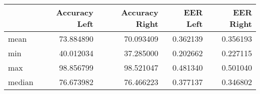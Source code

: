 \begin{tabular}{lrrrr}
\toprule
{} &  Accuracy Left &  Accuracy Right &  EER Left &  EER Right \\
\midrule
mean   &      73.884890 &       70.093409 &  0.362139 &   0.356193 \\
min    &      40.012034 &       37.285000 &  0.202662 &   0.227115 \\
max    &      98.856799 &       98.521047 &  0.481340 &   0.501040 \\
median &      76.673982 &       76.466223 &  0.377137 &   0.346802 \\
\bottomrule
\end{tabular}

